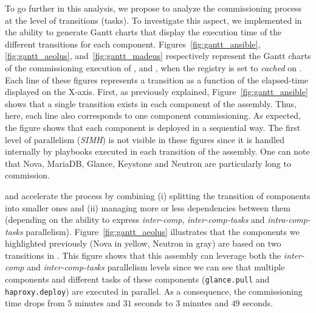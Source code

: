 To go further in this analysis, we propose to analyze the
commissioning process at the level of transitions (\ie tasks). To
investigate this aspect, we implemented in \mad the ability to
generate Gantt charts that display the execution time of the different
transitions for each component.
Figures~\ref{fig:gantt_ansible}, \ref{fig:gantt_aeolus},
and~\ref{fig:gantt_madeus} respectively represent the Gantt charts of
the commissioning execution of \ansass, \aeoass and \madass, when the
registry is set to \emph{cached} on \ecotype. Each line of these
figures represents a transition as a function of the elapsed-time
displayed on the X-axis.  First, as previously explained,
Figure~\ref{fig:gantt_ansible} shows that a single transition exists
in each component of the \ansass assembly. Thus, here, each line also
corresponds to one component commissioning. As expected, the figure
shows that each component is deployed in a sequential way. The first
level of parallelism (\ie \emph{SIMH}) is not visible in these figures
since it is handled internally by \ansible playbooks executed in each
transition of the assembly. One can note that Nova, MariaDB, Glance,
Keystone and Neutron are particularly long to commission. 

\aeoass and \madass accelerate the process by combining (i) splitting the
transition of components into smaller ones and (ii) managing more or
less dependencies between them (depending on the ability to express
\emph{inter-comp}, \emph{inter-comp-tasks} and \emph{intra-comp-tasks}
parallelism).
%
Figure~\ref{fig:gantt_aeolus} illustrates that the components we
highlighted previously (\eg Nova in yellow, Neutron in gray) are based
on two transitions in \aeoass. This figure shows that this assembly
can leverage both the \emph{inter-comp} and \emph{inter-comp-tasks}
parallelism levels since we can see that multiple components and
different tasks of these components (\eg \texttt{glance.pull} and
\texttt{haproxy.deploy}) are executed in parallel. As a consequence,
the commissioning time drops from $5$ minutes and $31$ seconds to $3$
minutes and $49$ seconds.

